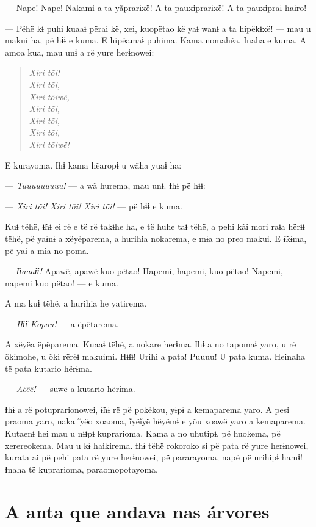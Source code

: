--- Nape! Nape! Nakami a ta yãprarɨxë! A ta pauxiprarɨxë! A ta pauxipraɨ
haɨro! 

--- Pëhë kɨ puhi kuaaɨ përai kë, xei, kuopëtao kë yaɨ wanɨ a ta hipëkɨxë!
--- mau u makui ha, pë hɨɨ e kuma. E hipëamaɨ puhima. Kama nomahẽa.
Ɨnaha e kuma. A amoa kua, mau unɨ a rë yure herɨnowei: 

\begin{verse}
\textit{Xiri tõi!\\
Xiri tõi,\\
Xiri tõiwë,\\
Xiri tõi,\\
Xiri tõi,\\
Xiri tõi,\\
Xiri tõiwë!}
\end{verse}

E kurayoma. Ɨhɨ kama hẽaropɨ u wãha yuaɨ ha: 

--- \textit{Tuuuuuuuuu!} --- a wã hurema, mau unɨ. Ɨhɨ pë hɨɨ: 

--- \textit{Xiri tõi! Xiri tõi! Xiri tõi!} --- pë hɨɨ e kuma. 

Kuɨ tëhë, ɨ̃hɨ ei rë e të rë takɨhe ha, e të huhe taɨ tëhë, a pehi kãi
mori raɨa hërɨɨ tëhë, pë yaɨnɨ a xëyëparema, a hurihia nokarema, e mɨa
no preo makui. E ɨ̃kɨma, pë yaɨ a mɨa no poma. 

--- \textit{Ɨɨaaaɨ̃ɨ!} Apawë, apawë kuo pëtao! Hapemi, hapemi, kuo pëtao! Napemi,
napemi kuo pëtao! --- e kuma. 

A ma kuɨ tëhë, a hurihia he yatirema. 

--- \textit{Hɨ̃ɨ Kopou!} --- a ëpëtarema. 

A xëyëa ëpëparema. Kuaaɨ tëhë, a nokare herɨma. Ɨhɨ a no tapomaɨ yaro, u
rë õkimohe, u õki rërëɨ makuimi. Hɨ̃ɨɨ! Urihi a pata! Puuuu! U pata kuma.
Heinaha të pata kutario hërɨma.

--- \textit{Aëëë!} --- suwë a kutario hërɨma. 

Ɨhɨ a rë potuprarionowei, ɨ̃hɨ rë pë pokëkou, yɨpɨ a kemaparema yaro. A pesi praoma yaro, naka ĩyëo xoaoma, ĩyëĩyë hëyëmɨ e yõu xoawë yaro a
kemaparema. Kutaenɨ hei mau u nɨɨpɨ kuprarioma. Kama a no uhutipɨ, pë
huokema, pë xerereokema. Mau u kɨ haikirema. Ɨhɨ tëhë rokoroko si pë
pata rë yure herɨnowei, kurata ai pë pehi pata rë yure herɨnowei, pë
pararayoma, napë pë urihipɨ hamɨ! Ɨnaha të kuprarioma, paraomopotayoma.

 \chapter{A anta que andava nas árvores}
 
